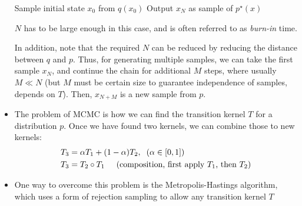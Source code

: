 \begin{itemize}
	\begin{algorithm}[H]
		Sample initial state $x_0$ from $q(x_0)$\;
		Output $x_N$ as sample of $p^{\star}(x)$\;
	\end{algorithm}
	$N$ has to be large enough in this case, and is often referred to as \textit{burn-in} time. 
	
	In addition, note that the required $N$ can be reduced by reducing the distance between $q$ and $p$. Thus, for generating multiple samples, we can take the first sample $x_N$, and continue the chain for additional $M$ steps, where usually $M\ll N$ (but $M$ must be certain size to guarantee independence of samples, depends on $T$). Then, $x_{N+M}$ is a new sample from $p$.
	
	\item The problem of MCMC is how we can find the transition kernel $T$ for a distribution $p$. Once we have found two kernels, we can combine those to new kernels:
	\begin{equation*}
		\begin{split}
			T_3 & = \alpha T_1 + (1 - \alpha) T_2, \hspace{2mm}(\alpha \in [0,1])\\
			T_3 & = T_2 \circ T_1 \hspace{5mm}(\text{composition, first apply $T_1$, then $T_2$})
		\end{split}
	\end{equation*}
	\item One way to overcome this problem is the Metropolis-Hastings algorithm, which uses a form of rejection sampling to allow any transition kernel $T$
\end{itemize}
